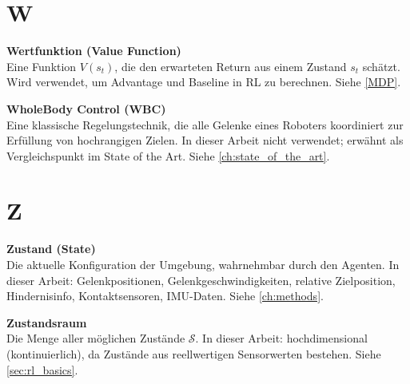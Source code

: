 \section*{W}

\vspace{0.3cm}
\noindent\textbf{Wertfunktion (Value Function)} \\
Eine Funktion $V(s_t)$, die den erwarteten Return aus einem Zustand $s_t$ schätzt. Wird verwendet, um Advantage und Baseline in RL zu berechnen. Siehe \autoref{MDP}.

\vspace{0.5cm}
\noindent\textbf{WholeBody Control (WBC)} \\
Eine klassische Regelungstechnik, die alle Gelenke eines Roboters koordiniert zur Erfüllung von hochrangigen Zielen. In dieser Arbeit nicht verwendet; erwähnt als Vergleichspunkt im State of the Art. Siehe \autoref{ch:state_of_the_art}.

\section*{Z}

\vspace{0.3cm}
\noindent\textbf{Zustand (State)} \\
Die aktuelle Konfiguration der Umgebung, wahrnehmbar durch den Agenten. In dieser Arbeit: Gelenkpositionen, Gelenkgeschwindigkeiten, relative Zielposition, Hindernisinfo, Kontaktsensoren, IMU-Daten. Siehe \autoref{ch:methods}.

\vspace{0.5cm}
\noindent\textbf{Zustandsraum} \\
Die Menge aller möglichen Zustände $\mathcal{S}$. In dieser Arbeit: hochdimensional (kontinuierlich), da Zustände aus reellwertigen Sensorwerten bestehen. Siehe \autoref{sec:rl_basics}.

